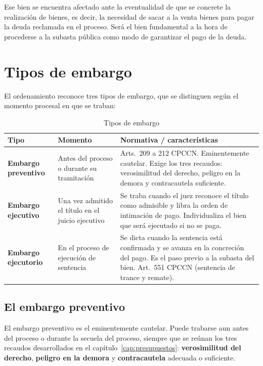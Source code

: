 \documentclass[12pt,oneside]{book}
\begin{document}
Ese bien se encuentra afectado ante la eventualidad de que se concrete la realización de bienes, es decir, la necesidad de sacar a la venta bienes para pagar la deuda reclamada en el proceso. Será el bien fundamental a la hora de procederse a la subasta pública como modo de garantizar el pago de la deuda.

\section{Tipos de embargo}

El ordenamiento reconoce tres tipos de embargo, que se distinguen según el momento procesal en que se traban:

\begin{table}[H]
\centering
\small
\begin{tabularx}{\textwidth}{>{\raggedright\arraybackslash}p{2.6cm} >{\raggedright\arraybackslash}p{3.6cm} >{\raggedright\arraybackslash}X}
\toprule
\textbf{Tipo} & \textbf{Momento} & \textbf{Normativa / características} \\
\midrule
\textbf{Embargo preventivo} & Antes del proceso o durante su tramitación & Arts.\ 209 a 212 CPCCN. Eminentemente cautelar. Exige los tres recaudos: verosimilitud del derecho, peligro en la demora y contracautela suficiente. \\
\addlinespace
\textbf{Embargo ejecutivo} & Una vez admitido el título en el juicio ejecutivo & Se traba cuando el juez reconoce el título como admisible y libra la orden de intimación de pago. Individualiza el bien que será ejecutado si no se paga. \\
\addlinespace
\textbf{Embargo ejecutorio} & En el proceso de ejecución de sentencia & Se dicta cuando la sentencia está confirmada y se avanza en la concreción del pago. Es el paso previo a la subasta del bien. Art.\ 551 CPCCN (sentencia de trance y remate). \\
\bottomrule
\end{tabularx}
\caption{Tipos de embargo}
\end{table}

\subsection{El embargo preventivo}

El embargo preventivo es el eminentemente cautelar. Puede trabarse aun antes del proceso o durante la secuela del proceso, siempre que se reúnan los tres recaudos desarrollados en el capítulo~\ref{cap:presupuestos}: \textbf{verosimilitud del derecho}, \textbf{peligro en la demora} y \textbf{contracautela} adecuada o suficiente.
\end{document}

